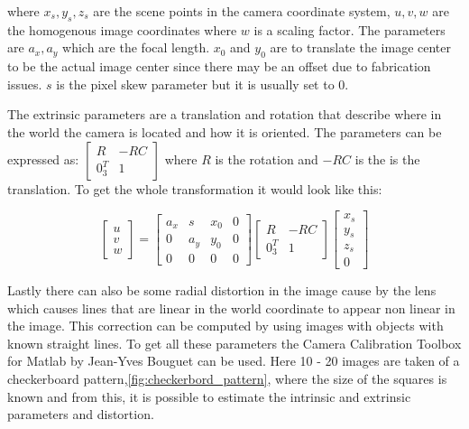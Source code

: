 where $x_s, y_s, z_s$ are the scene points in the camera coordinate system, $u, v, w$ are the homogenous image coordinates where $w$ is a scaling factor. The parameters are $a_x, a_y$ which are the focal length. $x_0$ and $y_0$ are to translate the image center to be the actual image center since there may be an offset due to fabrication issues.  $s$ is the pixel skew parameter but it is usually set to 0. 

The extrinsic parameters are a translation and rotation that describe where in the world the camera is located and how it is oriented. The parameters can be expressed as:
$ \begin{bmatrix}
R & -RC  \\
0_{3}^{T} & 1 
\end{bmatrix}  $
where $R$ is the rotation and $-RC$ is the is the translation. To get the whole transformation it would look like this:

\begin{equation}
\begin{bmatrix}
u \\
v \\
w 
\end{bmatrix} 
 =
\begin{bmatrix}
a_x & s & x_0 & 0 \\
0 & a_y & y_0 & 0 \\
0 & 0 & 0 & 0 
\end{bmatrix}  
\begin{bmatrix}
R & -RC  \\
0_{3}^{T} & 1 
\end{bmatrix}
\begin{bmatrix}
x_s \\
y_s \\
z_s \\
0 
\end{bmatrix}
\end{equation}

Lastly there can also be some radial distortion in the image cause by the lens which causes lines that are linear in the world coordinate to appear non linear in the image. This correction can be computed by using images with objects with known straight lines. To get all these parameters the Camera Calibration Toolbox for Matlab by Jean-Yves Bouguet can be used.  Here 10 - 20 images are taken of a checkerboard pattern,\autoref{fig:checkerbord_pattern}, where the size of the squares is known and from this, it is possible to estimate the intrinsic and extrinsic parameters and distortion. 

